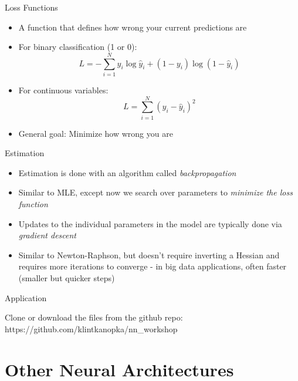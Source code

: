 \documentclass{beamer}
\begin{document}
        \begin{frame}{Loss Functions}
            \begin{itemize}
                \item<2-> A function that defines how wrong your current predictions are
                \item<3-> For binary classification (1 or 0):
                $$ L = -\sum_{i=1}^N y_i \log\hat{y}_i + (1 - y_i) \log (1-\hat{y}_i) $$
                \item<4-> For continuous variables:
                $$ L = \sum_{i=1}^N (y_i - \hat{y}_i)^2 $$
                \item<5-> General goal: Minimize how wrong you are
            \end{itemize}
        \end{frame}
        
        \begin{frame}{Estimation}
            \begin{itemize}
                \item Estimation is done with an algorithm called \em backpropagation \em
                \item Similar to MLE, except now we search over parameters to \em minimize \em the loss function
                \item Updates to the individual parameters in the model are typically done via \em gradient descent \em
                \item Similar to Newton-Raphson, but doesn't require inverting a Hessian and requires more iterations to converge - in big data applications, often faster (smaller but quicker steps)
            \end{itemize}
        \end{frame}
        
        \begin{frame}{Application}
            \begin{center}
                Clone or download the files from the github repo:\\
                \vskip 1cm
                https://github.com/klintkanopka/nn\_workshop
            \end{center}
        \end{frame}
        
    \section{Other Neural Architectures}
    
\end{document}
